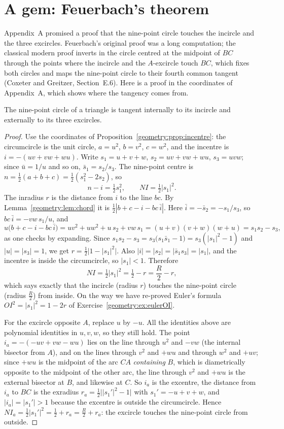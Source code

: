 \section{A gem: Feuerbach's theorem}

Appendix~A promised a proof that the nine-point circle touches the incircle and the three excircles. Feuerbach's original proof was a long
computation; the classical modern proof inverts in the circle centred at the midpoint of $BC$ through the points where the incircle and the
$A$-excircle touch $BC$, which fixes both circles and maps the nine-point circle to their fourth common tangent (Coxeter and Greitzer,
Section~E.6). Here is a proof in the coordinates of Appendix~A, which shows where the tangency comes from.

\begin{theorem}[Feuerbach, 1822]\label{geometry:thm:feuerbach}
The nine-point circle of a triangle is tangent internally to its incircle and externally to its three excircles.
\end{theorem}
\begin{proof}
Use the coordinates of Proposition~\ref{geometry:prop:incentre}: the circumcircle is the unit circle, $a=u^2$, $b=v^2$, $c=w^2$, and the incentre is
$i=-(uv+vw+wu)$. Write $s_1=u+v+w$, $s_2=uv+vw+wu$, $s_3=uvw$; since $\bar u=1/u$ and so on, $\bar s_1=s_2/s_3$. The nine-point centre is
$n=\frac12(a+b+c)=\frac12(s_1^2-2s_2)$, so
\[
n-i=\tfrac12s_1^2,\qquad NI=\tfrac12|s_1|^2 .
\]
The inradius $r$ is the distance from $i$ to the line $bc$. By Lemma~\ref{geometry:lem:chord} it is $\frac12|b+c-i-bc\,\bar i|$. Here
$\bar i=-\bar s_2=-s_1/s_3$, so $bc\,\bar i=-vw\,s_1/u$, and
\[
u\bigl(b+c-i-bc\,\bar i\bigr)=u v^2+uw^2+u\,s_2+vw\,s_1=(u+v)(v+w)(w+u)=s_1s_2-s_3,
\]
as one checks by expanding. Since $s_1s_2-s_3=s_3\bigl(s_1\bar s_1-1\bigr)=s_3(|s_1|^2-1)$ and $|u|=|s_3|=1$, we get $r=\frac12\bigl|1-|s_1|^2\bigr|$.
Also $|i|=|s_2|=|\bar s_1s_3|=|s_1|$, and the incentre is inside the circumcircle, so $|s_1|<1$. Therefore
\[
NI=\tfrac12|s_1|^2=\tfrac12-r=\frac R2-r ,
\]
which says exactly that the incircle (radius $r$) touches the nine-point circle (radius $\frac R2$) from inside. On the way we have re-proved
Euler's formula $OI^2=|s_1|^2=1-2r$ of Exercise~\ref{geometry:ex:eulerOI}.

For the excircle opposite $A$, replace $u$ by $-u$. All the identities above are polynomial identities in $u,v,w$, so they still hold. The
point $i_a=-(-uv+vw-wu)$ lies on the line through $u^2$ and $-vw$ (the internal bisector from $A$), and on the lines through $v^2$ and $+wu$ and
through $w^2$ and $+uv$; since $+wu$ is the midpoint of the arc $CA$ \emph{containing} $B$, which is diametrically opposite to the midpoint of
the other arc, the line through $v^2$ and $+wu$ is the external bisector at $B$, and likewise at $C$. So $i_a$ is the excentre, the distance
from $i_a$ to $BC$ is the exradius $r_a=\frac12\bigl||s_1'|^2-1\bigr|$ with $s_1'=-u+v+w$, and $|i_a|=|s_1'|>1$ because the excentre is outside
the circumcircle. Hence $NI_a=\frac12|s_1'|^2=\frac12+r_a=\frac R2+r_a$: the excircle touches the nine-point circle from outside.
\end{proof}

